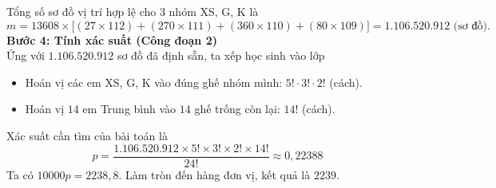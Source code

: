 \begin{ex}
{		Tổng số sơ đồ vị trí hợp lệ cho $3$ nhóm XS, G, K là
		$$m = 13608 \times \Big[ (27 \times 112) + (270 \times 111) + (360 \times 110) + (80 \times 109) \Big] = \mathbf{1.106.520.912} \text{ (sơ đồ)}.$$
		\textbf{Bước 4: Tính xác suất (Công đoạn 2)}\\
		Ứng với $1.106.520.912$ sơ đồ đã định sẵn, ta xếp học sinh vào lớp
		\begin{itemize}
			\item Hoán vị các em XS, G, K vào đúng ghế nhóm mình: $5! \cdot 3! \cdot 2!$ (cách).
			\item Hoán vị $14$ em Trung bình vào $14$ ghế trống còn lại: $14!$ (cách).
		\end{itemize}
		Xác suất cần tìm của bài toán là
		$$p = \dfrac{1.106.520.912 \times 5! \times 3! \times 2! \times 14!}{24!} \approx 0,22388$$
		Ta có $10000p = 2238,8$. Làm tròn đến hàng đơn vị, kết quả là $\boxed{2239}$.
	}
\end{ex}